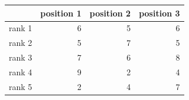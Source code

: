 \begin{tabular}{lrrr}
\toprule
 & position 1 & position 2 & position 3 \\
\midrule
rank 1 & 6 & 5 & 6 \\
rank 2 & 5 & 7 & 5 \\
rank 3 & 7 & 6 & 8 \\
rank 4 & 9 & 2 & 4 \\
rank 5 & 2 & 4 & 7 \\
\bottomrule
\end{tabular}
